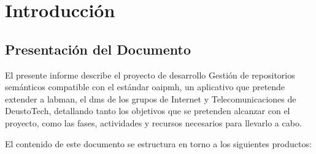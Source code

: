 \chapter{Introducción}\label{cha:introduccion}

\section{Presentación del Documento}

El presente informe describe el proyecto de desarrollo Gestión de repositorios semánticos compatible con el estándar \acrshort{oaipmh}, un aplicativo que pretende extender a \acrshort{labman}, el \acrlong{dms} de los grupos de Internet y Telecomunicaciones de DeustoTech, detallando tanto los objetivos que se pretenden alcanzar con el proyecto, como las fases, actividades y recursos necesarios para llevarlo a cabo.

El contenido de este documento se estructura en torno a los siguientes productos:

